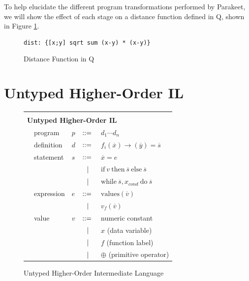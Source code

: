 \documentclass[preprint]{sigplanconf}
\begin{document}
To help elucidate the different program transformations performed by Parakeet, we will show the effect of each stage on a distance function defined in Q, shown in Figure \ref{QDist}.

\begin{figure}[h!]
    \begin{lstlisting}[numbers=none]
    dist: {[x;y] sqrt sum (x-y) * (x-y)}
    \end{lstlisting}
    \caption{Distance Function in Q}
    \label{QDist}
\end{figure}


\section{Untyped Higher-Order IL}
\begin{figure}[h!]
  \begin{tabular}{| m{0.01cm}m{1.5cm}m{0.1cm}m{0.2cm}p{4.5cm} |}
  \hline
  & & & &\\ 
   \multicolumn{5}{|l|}{\textbf{Untyped Higher-Order IL}}  \\[4pt]
  & program & $p$ &  $::=$   &  $d_1 \cdots d_n $ \\[4pt]
  & definition & $d$ & $::=$ & $f_i(\overline{x}) \rightarrow (\overline{y}) = \overline{s}$ \\[4pt]
  & statement  & $s$ & $::=$ & $\overline{x} = e $\\[2pt]
  &            &     & $\ \ | \ \ $    & $\mathrm{if} ~v~ \mathrm{then} ~ \overline{s} ~ \mathrm{else} ~ \overline{s} $ \\[2pt]
  &            &     & $\ \ | \ \ $    & $\mathrm{while} ~\overline{s}, x_{cond} ~ \mathrm{do} ~\overline{s}~ $  \\[5pt]
  & expression & $e$ & $::=$ & $\mathrm{values} (\overline{v})$ \\[2pt]
  &            &     & $\ \ | \ \ $    & $ v_f (\overline{v}) $ \\[9pt]
  & value      & $v$ & $::=$ & numeric constant \\[2pt]
  &            &     & $\ \ | \ \ $    &  $x$  \quad \small{(data variable)} \\[2pt]
  &            &     & $\ \ | \ \ $    &  $f$  \quad \small{(function label)} \\[2pt]
  &            &     & $\ \ | \ \ $    &  $\oplus$ \quad \small{(primitive operator)} \\[5pt]
  \hline
  \end{tabular}
\caption{Untyped Higher-Order Intermediate Language}
\end{figure}
\end{document}

